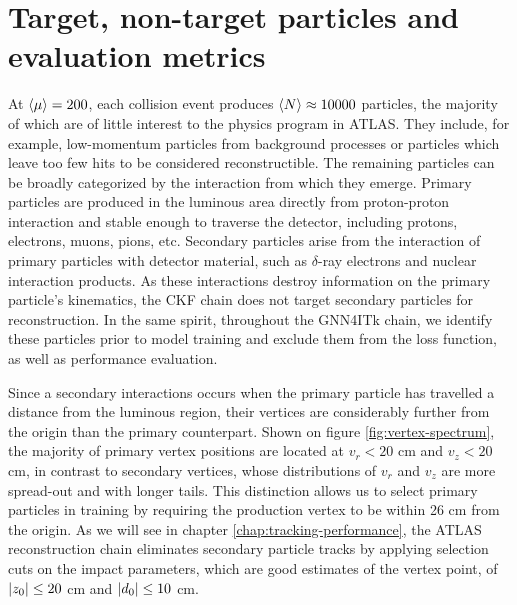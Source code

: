 \section{Target, non-target particles and evaluation metrics}
\label{sect:eval-metrics}
At $\expval{\mu}=200$, each collision event produces $\expval{N}\approx 10000$ particles, the majority of which are of little interest to the physics program in ATLAS. 
They include, for example, low-momentum particles from background processes or particles which leave too few hits to be considered reconstructible.
The remaining particles can be broadly categorized by the interaction from which they emerge. 
Primary particles are produced in the luminous area directly from proton-proton interaction and stable enough to traverse the detector, including protons, electrons, muons, pions, etc.
Secondary particles arise from the interaction of primary particles with detector material, such as $\delta$-ray electrons and nuclear interaction products. 
As these interactions destroy information on the primary particle's kinematics, the CKF chain does not target secondary particles for reconstruction.
In the same spirit, throughout the GNN4ITk chain, we identify these particles prior to model training and exclude them from the loss function, as well as performance evaluation.

Since a secondary interactions occurs when the primary particle has travelled a distance from the luminous region, their vertices are considerably further from the origin than the primary counterpart. 
Shown on figure \ref{fig:vertex-spectrum}, the majority of primary vertex positions are located at $v_r < 20$ cm and $v_z < 20$ cm, in contrast to secondary vertices, whose distributions of $v_r$ and $v_z$ are more spread-out and with longer tails.
This distinction allows us to select primary particles in training by requiring the production vertex to be within 26 cm from the origin.
As we will see in chapter \ref{chap:tracking-performance}, the ATLAS reconstruction chain eliminates secondary particle tracks by applying selection cuts on the impact parameters, which are good estimates of the vertex point, of $\abs{z_0}\le 20$ cm and $\abs{d_0}\le10$ cm. 

